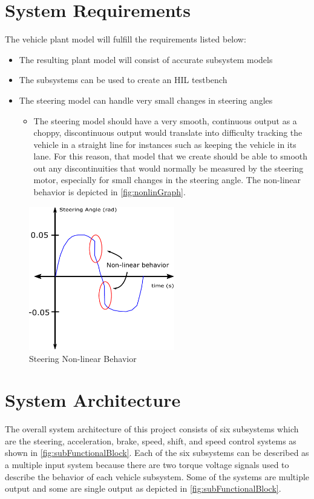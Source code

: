 \documentclass[letterpaper,12pt]{article}   %
\begin{document}
\section{System Requirements}
The vehicle plant model will fulfill the requirements listed below:
\begin{itemize}
    \item The resulting plant model will consist of accurate subsystem models
    \item The subsystems can be used to create an HIL testbench
    \item The steering model can handle very small changes in steering angles
    \begin{itemize}
    		\item The steering model should have a very smooth, continuous output as a choppy, discontinuous output would translate into difficulty tracking the vehicle in a straight line for instances such as keeping the vehicle in its lane. For this reason, that model that we create should be able to smooth out any discontinuities that would normally be measured by the steering motor, especially for small changes in the steering angle. The non-linear behavior is depicted in \autoref{fig:nonlinGraph}.
    \end{itemize}
\end{itemize}
\begin{figure}[h]
    \centering
    \captionsetup{justification=centering, margin=3cm}
    \includegraphics[width=2.5in]{figs/inkscape/nonlinearBehavior}
    \caption{Steering Non-linear Behavior}
    \label{fig:nonlinGraph}
\end{figure}


\section{System Architecture}
The overall system architecture of this project consists of six subsystems which are the steering, acceleration, brake, speed, shift, and speed control systems as shown in \autoref{fig:subFunctionalBlock}. Each of the six subsystems can be described as a multiple input system because there are two torque voltage signals used to describe the behavior of each vehicle subsystem. Some of the systems are multiple output and some are single output as depicted in \autoref{fig:subFunctionalBlock}.
\end{document}
